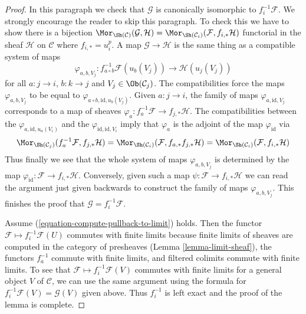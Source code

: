 \begin{proof}
\medskip\noindent
In this paragraph we check that $\mathcal{G}$ is canonically isomorphic to
$f_i^{-1}\mathcal{F}$. We strongly encourage the reader to skip this paragraph.
To check this we have to show there is a bijection
$\Mor_{\Sh(\mathcal{C})}(\mathcal{G}, \mathcal{H}) =
\Mor_{\Sh(\mathcal{C}_i)}(\mathcal{F}, f_{i, *}\mathcal{H})$
functorial in the sheaf $\mathcal{H}$ on $\mathcal{C}$
where $f_{i, *} = u_i^p$. A map
$\mathcal{G} \to \mathcal{H}$ is the same thing as a compatible
system of maps
$$
\varphi_{a, b, V_j} :
f_{a \circ b}^{-1}\mathcal{F}(u_b(V_j))
\longrightarrow
\mathcal{H}(u_j(V_j))
$$
for all $a : j \to i$, $b : k \to j$ and $V_j \in \Ob(\mathcal{C}_j)$.
The compatibilities force the maps $\varphi_{a, b, V_j}$ to be equal
to $\varphi_{a \circ b, \text{id}, u_b(V_j)}$. Given $a : j \to i$, the
family of maps $\varphi_{a, \text{id}, V_j}$ corresponds to a map
of sheaves $\varphi_a : f_a^{-1}\mathcal{F} \to f_{j, *}\mathcal{H}$.
The compatibilities between the $\varphi_{a, \text{id}, u_a(V_i)}$
and the $\varphi_{\text{id}, \text{id}, V_i}$ imply that $\varphi_a$
is the adjoint of the map $\varphi_{\text{id}}$ via
$$
\Mor_{\Sh(\mathcal{C}_j)}(f_a^{-1}\mathcal{F}, f_{j, *}\mathcal{H}) =
\Mor_{\Sh(\mathcal{C}_i)}(\mathcal{F}, f_{a, *}f_{j, *}\mathcal{H}) =
\Mor_{\Sh(\mathcal{C}_i)}(\mathcal{F}, f_{i, *}\mathcal{H})
$$
Thus finally we see that the whole system of maps $\varphi_{a, b, V_j}$
is determined by the map $\varphi_{\text{id}} : \mathcal{F} \to f_{i, *}\mathcal{H}$.
Conversely, given such a map $\psi : \mathcal{F} \to f_{i, *}\mathcal{H}$
we can read the argument just given backwards to construct the family
of maps $\varphi_{a, b, V_j}$. This finishes the proof that
$\mathcal{G} = f_i^{-1}\mathcal{F}$.

\medskip\noindent
Assume (\ref{equation-compute-pullback-to-limit}) holds. Then the functor
$\mathcal{F} \mapsto f_i^{-1}\mathcal{F}(U)$ commutes with finite limits
because finite limits of sheaves are computed in the category of presheaves
(Lemma \ref{lemma-limit-sheaf}), the functors $f_a^{-1}$ commute with finite
limits, and filtered colimits commute with finite limits. To see that
$\mathcal{F} \mapsto f_i^{-1}\mathcal{F}(V)$ commutes with finite limits
for a general object $V$ of $\mathcal{C}$, we can use the same argument using
the formula for $f_i^{-1}\mathcal{F}(V) = \mathcal{G}(V)$ given above.
Thus $f_i^{-1}$ is left exact and the proof of the lemma is complete.
\end{proof}

